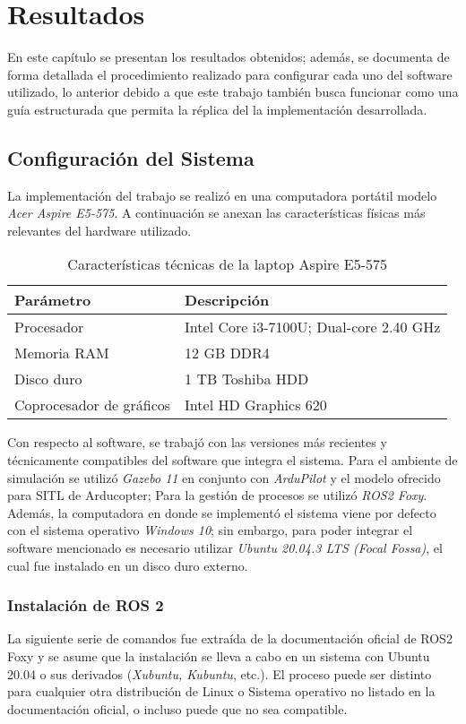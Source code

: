 \chapter{Resultados}

En este capítulo se presentan los resultados obtenidos; además, se documenta de forma detallada el procedimiento realizado para configurar cada uno del software utilizado, lo anterior debido a que este trabajo también busca funcionar como una guía estructurada que permita la réplica del la implementación desarrollada.

\section{Configuración del Sistema}
La implementación del trabajo se realizó en una computadora portátil modelo \textit{Acer Aspire E5-575}. A continuación se anexan las características físicas más relevantes del hardware utilizado.

\begin{table}
    \centering
    \begin{tabular}{||l|l||}
        \hline
        Parámetro & Descripción\\
        \hline
        Procesador & Intel Core i3-7100U; Dual-core 2.40 GHz\\
        Memoria RAM & 12 GB DDR4\\
        Disco duro & 1 TB Toshiba HDD\\
        Coprocesador de gráficos & Intel HD Graphics 620\\
        \hline
    \end{tabular}
    \caption{Características técnicas de la laptop Aspire E5-575}
    \label{tab:specs}
\end{table}

Con respecto al software, se trabajó con las versiones más recientes y técnicamente compatibles del software que integra el sistema. Para el ambiente de simulación se utilizó \textit{Gazebo 11} en conjunto con \textit{ArduPilot} y el modelo ofrecido para SITL de Arducopter; Para la gestión de procesos se utilizó \textit{ROS2 Foxy}. Además, la computadora en donde se implementó el sistema viene por defecto con el sistema operativo \textit{Windows 10}; sin embargo, para poder integrar el software mencionado es necesario utilizar \textit{Ubuntu 20.04.3 LTS (Focal Fossa)}, el cual fue instalado en un disco duro externo.

\subsection{Instalación de ROS 2}
La siguiente serie de comandos fue extraída de la documentación oficial de ROS2 Foxy\cite{ros2} y se asume que la instalación se lleva a cabo en un sistema con Ubuntu 20.04 o sus derivados (\textit{Xubuntu, Kubuntu}, etc.). El proceso puede ser distinto para cualquier otra distribución de Linux o Sistema operativo no listado en la documentación oficial, o incluso puede que no sea compatible.

